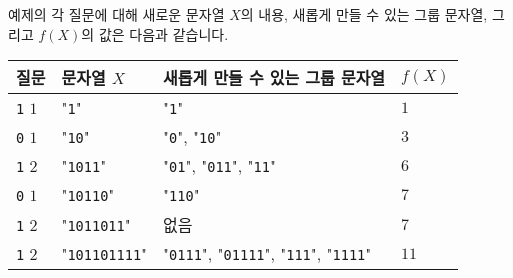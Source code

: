 예제의 각 질문에 대해 새로운 문자열 $X$의 내용, 새롭게 만들 수 있는 그룹 문자열, 그리고 $f(X)$의 값은 다음과 같습니다.

\begin{tabular}{|l|l|l|l|} \hline
  \textbf{질문} & \textbf{문자열 $X$} & \textbf{새롭게 만들 수 있는 그룹 문자열} & $f(X)$ \\ \hline
  \texttt{1} $1$ & "\texttt{1}" & "\texttt{1}" & $1$ \\ \hline
  \texttt{0} $1$ & "\texttt{10}" & "\texttt{0}", "\texttt{10}" & $3$ \\ \hline
  \texttt{1} $2$ & "\texttt{1011}" & "\texttt{01}", "\texttt{011}", "\texttt{11}" & $6$ \\ \hline
  \texttt{0} $1$ & "\texttt{10110}" & "\texttt{110}" & $7$ \\ \hline
  \texttt{1} $2$ & "\texttt{1011011}" & 없음 & $7$ \\ \hline
  \texttt{1} $2$ & "\texttt{101101111}" & "\texttt{0111}", "\texttt{01111}", "\texttt{111}", "\texttt{1111}" & $11$ \\ \hline
\end{tabular}